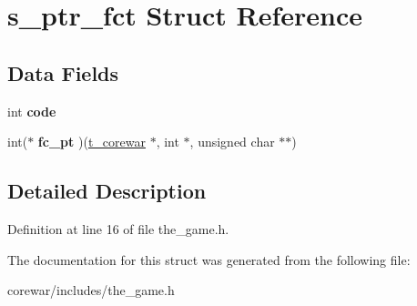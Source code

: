 \hypertarget{structs__ptr__fct}{\section{s\-\_\-ptr\-\_\-fct Struct Reference}
\label{structs__ptr__fct}
}
\subsection*{Data Fields}
\begin{DoxyCompactItemize}
\item 
\hypertarget{structs__ptr__fct_a45a5b7c00a796a23f01673cef1dbe0a9}{int {\bfseries code}}\label{structs__ptr__fct_a45a5b7c00a796a23f01673cef1dbe0a9}

\item 
\hypertarget{structs__ptr__fct_a422cc81fc03af1b32f561010f69e33cb}{int($\ast$ {\bfseries fc\-\_\-pt} )(\hyperlink{structs__corewar}{t\-\_\-corewar} $\ast$, int $\ast$, unsigned char $\ast$$\ast$)}\label{structs__ptr__fct_a422cc81fc03af1b32f561010f69e33cb}

\end{DoxyCompactItemize}


\subsection{Detailed Description}


Definition at line 16 of file the\-\_\-game.\-h.



The documentation for this struct was generated from the following file\-:\begin{DoxyCompactItemize}
\item 
corewar/includes/the\-\_\-game.\-h\end{DoxyCompactItemize}
